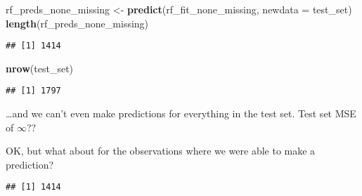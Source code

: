 \documentclass[]{article}
\newenvironment{Shaded}{\begin{snugshade}}{\end{snugshade}}
\newcommand{\KeywordTok}[1]{\textcolor[rgb]{0.13,0.29,0.53}{\textbf{#1}}}
\newcommand{\DataTypeTok}[1]{\textcolor[rgb]{0.13,0.29,0.53}{#1}}
\newcommand{\DecValTok}[1]{\textcolor[rgb]{0.00,0.00,0.81}{#1}}
\newcommand{\StringTok}[1]{\textcolor[rgb]{0.31,0.60,0.02}{#1}}
\newcommand{\ControlFlowTok}[1]{\textcolor[rgb]{0.13,0.29,0.53}{\textbf{#1}}}
\newcommand{\OperatorTok}[1]{\textcolor[rgb]{0.81,0.36,0.00}{\textbf{#1}}}
\newcommand{\NormalTok}[1]{#1}
\begin{document}
\begin{Shaded}
\begin{Highlighting}[]
\NormalTok{rf_preds_none_missing <-}\StringTok{ }\KeywordTok{predict}\NormalTok{(rf_fit_none_missing, }\DataTypeTok{newdata =}\NormalTok{ test_set)}
\KeywordTok{length}\NormalTok{(rf_preds_none_missing)}
\end{Highlighting}
\end{Shaded}

\begin{verbatim}
## [1] 1414
\end{verbatim}

\begin{Shaded}
\begin{Highlighting}[]
\KeywordTok{nrow}\NormalTok{(test_set)}
\end{Highlighting}
\end{Shaded}

\begin{verbatim}
## [1] 1797
\end{verbatim}

\ldots{}and we can't even make predictions for everything in the test
set. Test set MSE of \(\infty\)??

OK, but what about for the observations where we were able to make a
prediction?

\begin{Shaded}
\end{Shaded}

\begin{verbatim}
## [1] 1414
\end{verbatim}

\begin{Shaded}
\end{Shaded}
\end{document}
